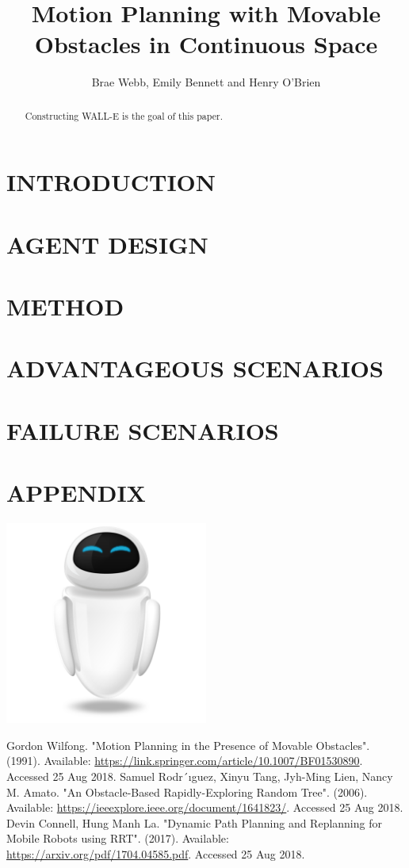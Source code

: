 \documentclass[a4paper, 10pt, conference]{IEEEtran}
\title{\LARGE \bf
Motion Planning with Movable Obstacles in Continuous Space
}
\author{Brae Webb, Emily Bennett and Henry O'Brien}
\begin{document}
\maketitle
\thispagestyle{empty}
\pagestyle{empty}

\begin{abstract}
Constructing WALL-E is the goal of this paper.
\end{abstract}

\section{INTRODUCTION}


\section{AGENT DESIGN}


\section{METHOD}


\section{ADVANTAGEOUS SCENARIOS}


\section{FAILURE SCENARIOS}


\section*{APPENDIX}
\includegraphics[width=0.5\textwidth]{../logo.png}


\begin{thebibliography}{99}

 Gordon Wilfong. "Motion Planning in the Presence of Movable Obstacles". (1991). Available: \url{https://link.springer.com/article/10.1007/BF01530890}. Accessed 25 Aug 2018.
 Samuel Rodr´ıguez, Xinyu Tang, Jyh-Ming Lien, Nancy M. Amato. "An Obstacle-Based Rapidly-Exploring Random Tree". (2006). Available: \url{https://ieeexplore.ieee.org/document/1641823/}. Accessed 25 Aug 2018.
 Devin Connell, Hung Manh La. "Dynamic Path Planning and Replanning for Mobile Robots using RRT". (2017). Available: \url{https://arxiv.org/pdf/1704.04585.pdf}. Accessed 25 Aug 2018.

\end{thebibliography}
\end{document}
